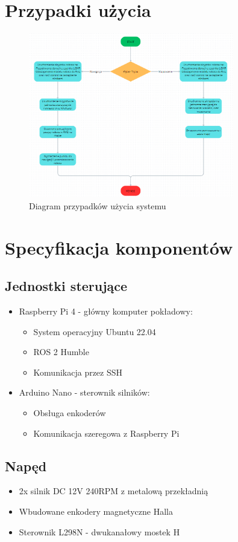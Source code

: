 \documentclass[a4paper,twoside,12pt]{book}
\begin{document}
\section{Przypadki użycia}
\begin{figure}[h]
\centering
\includegraphics[width=0.8\textwidth]{images/UML.png}
\caption{Diagram przypadków użycia systemu}
\label{fig:use-case}
\end{figure}

\section{Specyfikacja komponentów}
\subsection{Jednostki sterujące}
\begin{itemize}
\item Raspberry Pi 4 - główny komputer pokładowy:
	\begin{itemize}
	\item System operacyjny Ubuntu 22.04
	\item ROS 2 Humble
	\item Komunikacja przez SSH
	\end{itemize}
\item Arduino Nano - sterownik silników:
	\begin{itemize}
	\item Obsługa enkoderów
	\item Komunikacja szeregowa z Raspberry Pi
	\end{itemize}
\end{itemize}

\subsection{Napęd}
\begin{itemize}
\item 2x silnik DC 12V 240RPM z metalową przekładnią
\item Wbudowane enkodery magnetyczne Halla
\item Sterownik L298N - dwukanałowy mostek H
\end{itemize}
\end{document}
